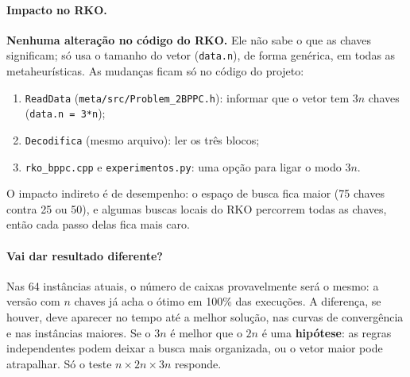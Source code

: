 \documentclass[11pt,a4paper]{article}
\begin{document}
\paragraph{Impacto no RKO.} \textbf{Nenhuma alteração no código do RKO.} Ele não sabe o que as chaves significam; só usa
o tamanho do vetor (\texttt{data.n}), de forma genérica, em todas as metaheurísticas. As mudanças ficam só no código
do projeto:
\begin{enumerate}[leftmargin=*,itemsep=0pt]
\item \texttt{ReadData} (\texttt{meta/src/Problem\_2BPPC.h}): informar que o vetor tem $3n$ chaves (\texttt{data.n = 3*n});
\item \texttt{Decodifica} (mesmo arquivo): ler os três blocos;
\item \texttt{rko\_bppc.cpp} e \texttt{experimentos.py}: uma opção para ligar o modo $3n$.
\end{enumerate}
O impacto indireto é de desempenho: o espaço de busca fica maior (75 chaves contra 25 ou 50), e algumas buscas locais
do RKO percorrem todas as chaves, então cada passo delas fica mais caro.

\paragraph{Vai dar resultado diferente?} Nas 64 instâncias atuais, o número de caixas provavelmente será o mesmo: a
versão com $n$ chaves já acha o ótimo em 100\% das execuções. A diferença, se houver, deve aparecer no tempo até a
melhor solução, nas curvas de convergência e nas instâncias maiores. Se o $3n$ é melhor que o $2n$ é uma
\textbf{hipótese}: as regras independentes podem deixar a busca mais organizada, ou o vetor maior pode atrapalhar.
Só o teste $n\times2n\times3n$ responde.

\end{document}

